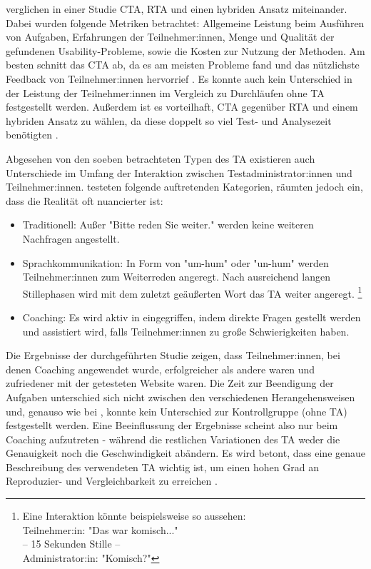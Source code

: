 \textcite{alhadretiRethinkingThinking2018} verglichen in einer Studie \ac{CTA}, \ac{RTA} und einen hybriden Ansatz miteinander. Dabei wurden folgende Metriken betrachtet: Allgemeine Leistung beim Ausführen von Aufgaben, Erfahrungen der Teilnehmer:innen, Menge und Qualität der gefundenen Usability-Probleme, sowie die Kosten zur Nutzung der Methoden. Am besten schnitt das \acl{CTA} ab, da es am meisten Probleme fand und das nützlichste Feedback von Teilnehmer:innen hervorrief \parencite{alhadretiRethinkingThinking2018}. Es konnte auch kein Unterschied in der Leistung der Teilnehmer:innen im Vergleich zu Durchläufen ohne \ac{TA} festgestellt werden. Außerdem ist es vorteilhaft, \ac{CTA} gegenüber \ac{RTA} und einem hybriden Ansatz zu wählen, da diese doppelt so viel Test- und Analysezeit benötigten \parencite{alhadretiRethinkingThinking2018}.

\pskip
Abgesehen von den soeben betrachteten Typen des \acl{TA} existieren auch Unterschiede im Umfang der Interaktion zwischen Testadministrator:innen und Teilnehmer:innen. \textcite{olmsted-hawalaThinkaloudProtocols2010} testeten folgende auftretenden Kategorien, räumten jedoch ein, dass die Realität oft nuancierter ist:
\begin{itemize}
  \item Traditionell: Außer "Bitte reden Sie weiter." werden keine weiteren Nachfragen angestellt.
  \item Sprachkommunikation: In Form von "um-hum" oder "un-hum" werden Teilnehmer:innen zum Weiterreden angeregt. Nach ausreichend langen Stillephasen wird mit dem zuletzt geäußerten Wort das \acl{TA} weiter angeregt. \footnote{Eine Interaktion könnte beispielsweise so aussehen:\\ Teilnehmer:in: "Das war komisch..." \\ -- 15 Sekunden Stille -- \\ Administrator:in: "Komisch?"}
  \item Coaching: Es wird aktiv in eingegriffen, indem direkte Fragen gestellt werden und assistiert wird, falls Teilnehmer:innen zu große Schwierigkeiten haben.
\end{itemize}
Die Ergebnisse der \citeyear{olmsted-hawalaThinkaloudProtocols2010} durchgeführten Studie zeigen, dass Teilnehmer:innen, bei denen Coaching angewendet wurde, erfolgreicher als andere waren und zufriedener mit der getesteten Website waren. Die Zeit zur Beendigung der Aufgaben unterschied sich nicht zwischen den verschiedenen Herangehensweisen und, genauso wie bei \citeauthor{alhadretiRethinkingThinking2018}, konnte kein Unterschied zur Kontrollgruppe (ohne \ac{TA}) festgestellt werden. Eine Beeinflussung der Ergebnisse scheint also nur beim Coaching aufzutreten - während die restlichen Variationen des \ac{TA} weder die Genauigkeit noch die Geschwindigkeit abändern. Es wird betont, dass eine genaue Beschreibung des verwendeten \acl{TA} wichtig ist, um einen hohen Grad an Reproduzier- und Vergleichbarkeit zu erreichen \parencite{alhadretiRethinkingThinking2018}.

